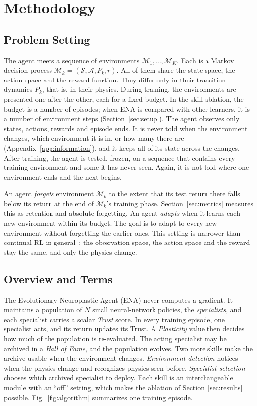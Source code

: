 \section{Methodology}
\label{sec:method}

\subsection{Problem Setting}
\label{sec:problem}
The agent meets a sequence of environments $\mathcal{M}_1, \dots, \mathcal{M}_K$. Each is a Markov decision process $\mathcal{M}_k = (\mathcal{S}, \mathcal{A}, P_k, r)$. All of them share the state space, the action space and the reward function. They differ only in their transition dynamics $P_k$, that is, in their physics. During training, the environments are presented one after the other, each for a fixed budget. In the skill ablation, the budget is a number of episodes; when ENA is compared with other learners, it is a number of environment steps (Section~\ref{sec:setup}). The agent observes only states, actions, rewards and episode ends. It is never told when the environment changes, which environment it is in, or how many there are (Appendix~\ref{app:information}), and it keeps all of its state across the changes. After training, the agent is tested, frozen, on a sequence that contains every training environment and some it has never seen. Again, it is not told where one environment ends and the next begins.

An agent \textit{forgets} environment $\mathcal{M}_k$ to the extent that its test return there falls below its return at the end of $\mathcal{M}_k$'s training phase. Section~\ref{sec:metrics} measures this as retention and absolute forgetting. An agent \textit{adapts} when it learns each new environment within its budget. The goal is to adapt to every new environment without forgetting the earlier ones. This setting is narrower than continual RL in general~\citep{khetarpal2022towards}: the observation space, the action space and the reward stay the same, and only the physics change.

\subsection{Overview and Terms}
The Evolutionary Neuroplastic Agent (ENA) never computes a gradient. It maintains a population of $N$ small neural-network policies, the \textit{specialists}, and each specialist carries a scalar \textit{Trust} score. In every training episode, one specialist acts, and its return updates its Trust. A \textit{Plasticity} value then decides how much of the population is re-evaluated. The acting specialist may be archived in a \textit{Hall of Fame}, and the population evolves. Two more skills make the archive usable when the environment changes. \textit{Environment detection} notices when the physics change and recognizes physics seen before. \textit{Specialist selection} chooses which archived specialist to deploy. Each skill is an interchangeable module with an ``off'' setting, which makes the ablation of Section~\ref{sec:results} possible. Fig.~\ref{fig:algorithm} summarizes one training episode.

